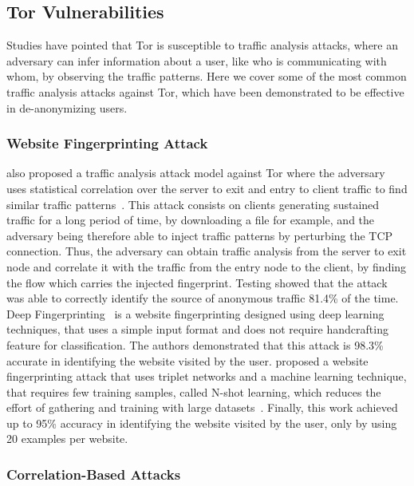 \subsection{Tor Vulnerabilities}\label{subsec:tor_vulnerabilities}

Studies have pointed that Tor is susceptible to traffic analysis attacks, where an adversary can infer information about a user, like who is communicating with whom, by observing the traffic patterns. Here we cover some of the most common traffic analysis attacks against Tor, which have been demonstrated to be effective in de-anonymizing users.

\subsubsection{Website Fingerprinting Attack}\label{subsubsec:website_fingerprinting_attack}

\citeauthor{chakravarty2014trafficanalysis} also proposed a traffic analysis attack model against Tor where the adversary uses statistical correlation over the server to exit and entry to client traffic to find similar traffic patterns~\cite{chakravarty2014trafficanalysis}. This attack consists on clients generating sustained traffic for a long period of time, by downloading a file for example, and the adversary being therefore able to inject traffic patterns by perturbing the TCP connection. Thus, the adversary can obtain traffic analysis from the server to exit node and correlate it with the traffic from the entry node to the client, by finding the flow which carries the injected fingerprint.
Testing showed that the attack was able to correctly identify the source of anonymous traffic 81.4\% of the time.
Deep Fingerprinting~\cite{DeepFingerprinting} is a website fingerprinting designed using deep learning techniques, that uses a simple input format and does not require handcrafting feature for classification. The authors demonstrated that this attack is 98.3\% accurate in identifying the website visited by the user.
\citeauthor{TripletFingerprinting} proposed a website fingerprinting attack that uses triplet networks and a machine learning technique, that requires few training samples, called N-shot learning, which reduces the effort of gathering and training with large datasets~\cite{TripletFingerprinting}. Finally, this work achieved up to 95\% accuracy in identifying the website visited by the user, only by using 20 examples per website.

\subsubsection{Correlation-Based Attacks}\label{subsubsec:correlation_based_attacks}

